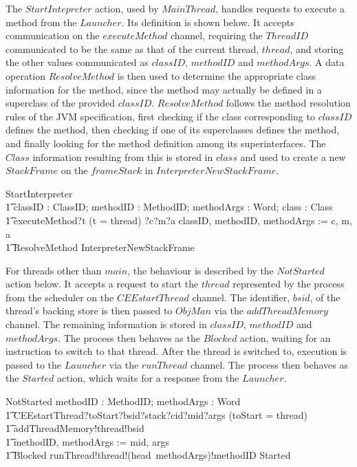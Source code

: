 The $StartIntepreter$ action, used by $MainThread$, handles requests
to execute a method from the $Launcher$.
Its definition is shown below.
It accepts communication on the $executeMethod$ channel, requiring the
$ThreadID$ communicated to be the same as that of the current thread,
$thread$, and storing the other values communicated as $classID$,
$methodID$ and $methodArgs$.
A data operation $ResolveMethod$ is then used to determine the
appropriate class information for the method, since the method may
actually be defined in a superclass of the provided $classID$.
$ResolveMethod$ follows the method resolution rules of the JVM
specification, first checking if the class corresponding to $classID$
defines the method, then checking if one of its superclasses defines
the method, and finally looking for the method definition among its
superinterfaces.
The $Class$ information resulting from this is stored in $class$ and
used to create a new $StackFrame$ on the $frameStack$ in
$InterpreterNewStackFrame$.
{\setlength{\zedtab}{0.5cm}
\begin{circusaction}
  StartInterpreter \circdef \\
  \t1  \circvar classID : ClassID; methodID : MethodID; methodArgs : \seq Word; class : Class \circspot \\
  \t1 executeMethod?t \prefixcolon (t = thread) ?c?m?a \then classID, methodID, methodArgs := c, m, a \circseq \\
  \t1 \lschexpract ResolveMethod \rschexpract \circseq \lschexpract InterpreterNewStackFrame \rschexpract
\end{circusaction}}

For threads other than $main$, the behaviour is described by the
$NotStarted$ action below.
It accepts a request to start the $thread$ represented by the process
from the scheduler on the $CEEstartThread$ channel.
The identifier, $bsid$, of the thread's backing store is then passed
to $ObjMan$ via the $addThreadMemory$ channel.
The remaining information is stored in $classID$, $methodID$ and
$methodArgs$. 
The process then behaves as the $Blocked$ action, waiting for an
instruction to switch to that thread.
After the thread is switched to, execution is passed to the $Launcher$
via the $runThread$ channel.
The process then behaves as the $Started$ action, which waits for a
response from the $Launcher$.
\begin{circusaction}
  NotStarted \circdef \circvar methodID : MethodID; methodArgs : \seq Word \circspot \\
  \t1 CEEstartThread?toStart?bsid?stack?cid?mid?args \prefixcolon (toStart = thread) \\
  \t1 {} \then addThreadMemory!thread!bsid \\
  \t1 {} \then methodID, methodArgs := mid, args \circseq \\
  \t1 Blocked \circseq runThread!thread!(head~methodArgs)!methodID \then Started
\end{circusaction}

